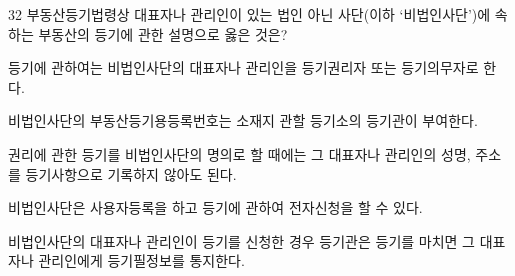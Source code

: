 \begin{question}{32}
부동산등기법령상 대표자나 관리인이 있는 법인 아닌 사단(이하 ‘비법인사단’)에 속하는 부동산의 등기에 관한 설명으로 옳은 것은?
\begin{choices}
  \item 등기에 관하여는 비법인사단의 대표자나 관리인을 등기권리자 또는 등기의무자로 한다.
  \item 비법인사단의 부동산등기용등록번호는 소재지 관할 등기소의 등기관이 부여한다.
  \item 권리에 관한 등기를 비법인사단의 명의로 할 때에는 그 대표자나 관리인의 성명, 주소를 등기사항으로 기록하지 않아도 된다.
  \item 비법인사단은 사용자등록을 하고 등기에 관하여 전자신청을 할 수 있다.
  \item 비법인사단의 대표자나 관리인이 등기를 신청한 경우 등기관은 등기를 마치면 그 대표자나 관리인에게 등기필정보를 통지한다.
\end{choices}
\end{question}
